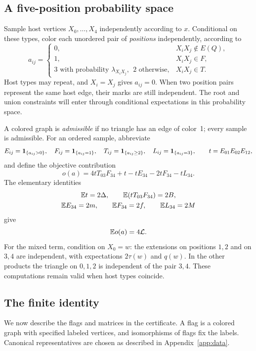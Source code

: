 \subsection{A five-position probability space}
Sample host vertices $X_0,\ldots,X_4$ independently according to $x$. Conditional on these types, color each unordered pair of \emph{positions} independently, according to
\[
 a_{ij}=\begin{cases}
 0,&X_iX_j\notin E(Q),\\
 1,&X_iX_j\in F,\\
 3\text{ with probability }\lambda_{X_iX_j},\ \ 2\text{ otherwise},
   &X_iX_j\in T.
 \end{cases}
\]
Host types may repeat, and $X_i=X_j$ gives $a_{ij}=0$. When two position pairs represent the same host edge, their marks are still independent. The root and union constraints will enter through conditional expectations in this probability space.

A colored graph is \emph{admissible} if no triangle has an edge of color~1; every sample is admissible. For an ordered sample, abbreviate
\[
 E_{ij}=\mathbf 1_{\{a_{ij}>0\}},\quad F_{ij}=\mathbf 1_{\{a_{ij}=1\}},\quad
 T_{ij}=\mathbf 1_{\{a_{ij}\ge2\}},\quad L_{ij}=\mathbf 1_{\{a_{ij}=3\}},
 \qquad t=E_{01}E_{02}E_{12},
\]
and define the objective contribution
\begin{equation}\label{eq:orderedobjective}
 o(a)=4tT_{03}F_{34}+t-tE_{34}-2tF_{34}-tL_{34}.
\end{equation}
The elementary identities
\begin{gather*}
 \mathbb E t=2\Delta,\qquad \mathbb E(tT_{03}F_{34})=2B,\\
 \mathbb E E_{34}=2m,\qquad \mathbb E F_{34}=2f,\qquad \mathbb E L_{34}=2M
\end{gather*}
give
\begin{equation}\label{eq:objectiveexpectation}
 \mathbb E o(a)=4\mathcal L.
\end{equation}
For the mixed term, condition on $X_0=w$: the extensions on positions $1,2$ and on $3,4$ are independent, with expectations $2\tau(w)$ and $q(w)$. In the other products the triangle on $0,1,2$ is independent of the pair $3,4$. These computations remain valid when host types coincide.

\subsection{The finite identity}
We now describe the flags and matrices in the certificate. A flag is a colored graph with specified labeled vertices, and isomorphisms of flags fix the labels. Canonical representatives are chosen as described in Appendix~\ref{app:data}.

